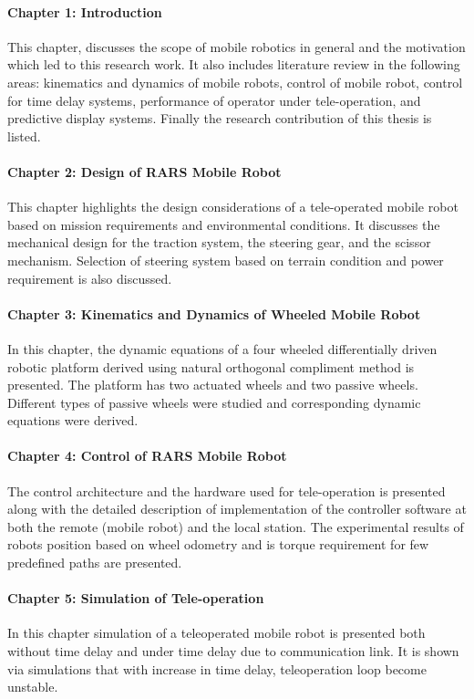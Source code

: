 \paragraph*{Chapter 1: Introduction\\}
This  chapter, discusses the scope of mobile robotics in general and the motivation which led to this research work. It also includes literature review in the following areas: kinematics and dynamics of mobile robots, control of mobile robot, control for time delay systems, performance of operator under tele-operation,  and predictive display systems. Finally the research contribution of this thesis is listed. 


\paragraph*{Chapter 2: Design of RARS Mobile Robot\\}
This chapter highlights the design considerations of a tele-operated mobile robot based on mission requirements and  environmental conditions.  It  discusses the mechanical design for the traction system, the steering gear, and the scissor mechanism. Selection of  steering system based on terrain condition and power requirement is also discussed.   
\paragraph*{Chapter 3: Kinematics and Dynamics of Wheeled Mobile Robot \\}
In this chapter, the dynamic equations of a four wheeled differentially driven robotic platform derived using natural orthogonal compliment method is presented. The platform has two actuated wheels and two passive wheels. Different types of passive wheels were studied and  corresponding dynamic equations were derived. 
\paragraph*{Chapter 4: Control of RARS Mobile Robot \\}
The control architecture and the hardware used for tele-operation is presented along with the detailed description of implementation of the controller software at both the remote (mobile robot)  and the local station. The experimental results of robots position based on wheel odometry and is torque requirement for few predefined paths are presented. 

\paragraph*{Chapter 5: Simulation of Tele-operation \\}
In this chapter simulation of a teleoperated mobile robot is presented both without time delay and  under time delay due to communication link. It is shown via simulations that with increase in time delay,  teleoperation loop become unstable. 
 
